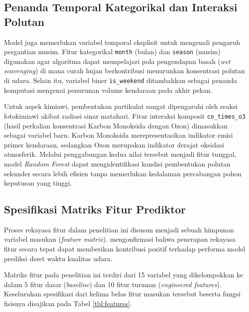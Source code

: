 \subsection{Penanda Temporal Kategorikal dan Interaksi Polutan}

Model juga memerlukan variabel temporal eksplisit untuk mengenali pengaruh pergantian musim. Fitur kategorikal \texttt{month} (bulan) dan \texttt{season} (musim) digunakan agar algoritma dapat mempelajari pola pengendapan basah (\textit{wet scavenging}) di mana curah hujan berkontribusi menurunkan konsentrasi polutan di udara. Selain itu, variabel biner \texttt{is\_weekend} ditambahkan sebagai penanda komputasi mengenai penurunan volume kendaraan pada akhir pekan.

Untuk aspek kimiawi, pembentukan partikulat sangat dipengaruhi oleh reaksi fotokimiawi akibat radiasi sinar matahari. Fitur interaksi komposit \texttt{co\_times\_o3} (hasil perkalian konsentrasi Karbon Monoksida dengan Ozon) dimasukkan sebagai variabel baru. Karbon Monoksida merepresentasikan indikator emisi primer kendaraan, sedangkan Ozon merupakan indikator derajat oksidasi atmosferik. Melalui penggabungan kedua nilai tersebut menjadi fitur tunggal, model \textit{Random Forest} dapat mengidentifikasi kondisi pembentukan polutan sekunder secara lebih efisien tanpa memerlukan kedalaman percabangan pohon keputusan yang tinggi.

\subsection{Spesifikasi Matriks Fitur Prediktor}

Proses rekayasa fitur dalam penelitian ini disusun menjadi sebuah himpunan variabel masukan (\textit{feature matrix}). \textcite{naz2024two} mengonfirmasi bahwa penerapan rekayasa fitur secara tepat dapat memberikan kontribusi positif terhadap performa model prediksi deret waktu kualitas udara.

Matriks fitur pada penelitian ini terdiri dari 15 variabel yang dikelompokkan ke dalam 5 fitur dasar (\textit{baseline}) dan 10 fitur turunan (\textit{engineered features}). Keseluruhan spesifikasi dari kelima belas fitur masukan tersebut beserta fungsi fisisnya disajikan pada Tabel \ref{tbl:features}.

